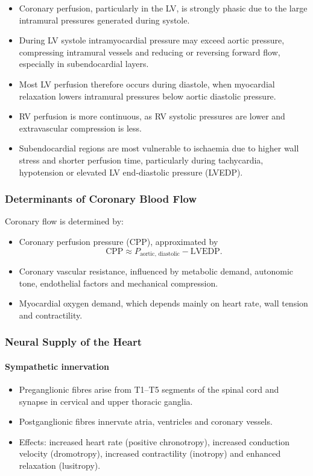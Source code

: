 \documentclass[11pt,a4paper]{article}
\begin{document}
\begin{itemize}
  \item Coronary perfusion, particularly in the LV, is strongly phasic due to the large intramural pressures generated during systole.
  \item During LV systole intramyocardial pressure may exceed aortic pressure, compressing intramural vessels and reducing or reversing forward flow, especially in subendocardial layers.
  \item Most LV perfusion therefore occurs during diastole, when myocardial relaxation lowers intramural pressures below aortic diastolic pressure.
  \item RV perfusion is more continuous, as RV systolic pressures are lower and extravascular compression is less.
  \item Subendocardial regions are most vulnerable to ischaemia due to higher wall stress and shorter perfusion time, particularly during tachycardia, hypotension or elevated LV end-diastolic pressure (LVEDP).
\end{itemize}

\subsubsection{Determinants of Coronary Blood Flow}

Coronary flow is determined by:
\begin{itemize}
  \item Coronary perfusion pressure (CPP), approximated by
        \[
        \text{CPP} \approx P_{\text{aortic, diastolic}} - \text{LVEDP}.
        \]
  \item Coronary vascular resistance, influenced by metabolic demand, autonomic tone, endothelial factors and mechanical compression.
  \item Myocardial oxygen demand, which depends mainly on heart rate, wall tension and contractility.
\end{itemize}

\subsubsection{Neural Supply of the Heart}

\paragraph{Sympathetic innervation}
\begin{itemize}
  \item Preganglionic fibres arise from T1--T5 segments of the spinal cord and synapse in cervical and upper thoracic ganglia.
  \item Postganglionic fibres innervate atria, ventricles and coronary vessels.
  \item Effects: increased heart rate (positive chronotropy), increased conduction velocity (dromotropy), increased contractility (inotropy) and enhanced relaxation (lusitropy).
\end{itemize}
\end{document}
